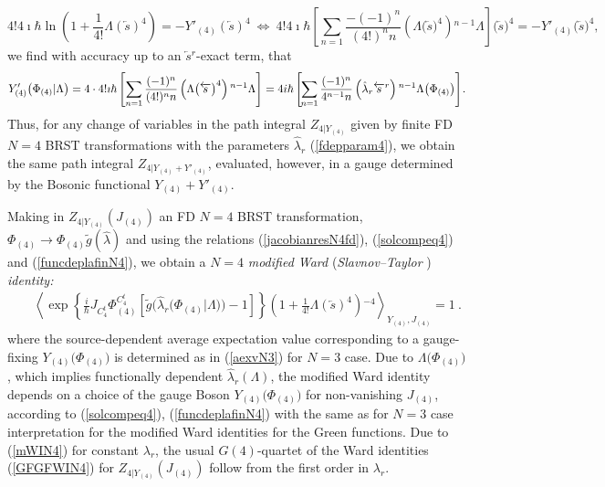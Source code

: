 \documentclass[10pt]{article}
\begin{document}
\begin{equation}
4!4\imath\hbar\ln\left( 1+\frac{1}{4!}\Lambda(\overleftarrow{s})^4\right)
= -Y'_{(4)}(\overleftarrow{s})^4\ \Longleftrightarrow\ 4!4 \imath\hbar\left[
\sum_{n=1}\frac{-(-1)^{n}}{(4!)^{n} n}\left( \Lambda\big(\overleftarrow{s}\big)^4\right)
{}^{n-1} \Lambda\right] \big(\overleftarrow{s}\big)^4 =  -Y'_{(4)}\big(\overleftarrow{s}\big)^4, \label{eqexpN4}%
\end{equation}
we find  with accuracy up to an $\overleftarrow{s}{}^{r}$-exact term,
that
\begin{equation}
\label{oppN4sol} Y'_{(4)}\big({\Phi}_{(4)}| \Lambda\big) = 4\cdot4!\imath\hbar\left[ \sum
_{n=1}\frac{(-1)^{n}}{(4!)^{n} n}\left( \Lambda\big(\overleftarrow{s}\big)^{4}\right)
{}^{n-1} \Lambda\right]  = 4i\hbar\left[\hspace{-0.1em} \sum_{n=1}\frac{(-1)^{n}%
}{4^{n-1} n}\left( \hat{\lambda}_{r}\overleftarrow{s}^{r}\right) {}^{n-1}
\Lambda\big({\Phi}_{(4)}\big)\right]\hspace{-0.1em} .
\end{equation}
Thus, for any change of variables in the path integral $Z_{4|Y_{(4)}}$
given by finite FD $N=4$ BRST transformations with the parameters
$\hat{\lambda}_{r}$ (\ref{fdepparam4}),
we obtain %
the same path integral $Z_{4|Y_{(4)}+ Y'_{(4)}}$, evaluated, however,
in a gauge determined by the Bosonic functional $Y_{(4)}+ Y'_{(4)}$.

Making in $Z_{4|Y_{(4)}}({J}_{(4)})$ an FD $N=4$ BRST  transformation,
${\Phi}_{(4)} \to {\Phi}_{(4)}\tilde{g}(\hat{\lambda})$
and using the relations (\ref{jacobianresN4fd}), (\ref{solcompeq4}) and (\ref{funcdeplafinN4}),
we obtain a $N=4$ \emph{modified Ward} (\emph{Slavnov--Taylor}%
) \emph{identity:}%
\begin{eqnarray}
&& \left\langle \exp\left\{ \frac{i}{\hbar}{J}_{C^t_4}{\Phi}{}^{C^t_4}_{(4)}\left[ \tilde{g}\big(\hat{\lambda}_r\big({\Phi}_{(4)}|\Lambda\big)\big)-1\right]\right\}  \left(  1+\frac{1}{4!}\Lambda(\overleftarrow
{s})^{4}\right)  {}^{-4}\right\rangle _{Y_{(4)},{J}_{(4)}} =1\ . \label{mWIN4}%
\end{eqnarray}
where the  source-dependent average expectation value corresponding to a gauge-fixing
$Y_{(4)}\big({\Phi}_{(4)}\big)$ is determined as in (\ref{aexvN3}) for $N=3$ case.
Due to  $\Lambda\big({\Phi}_{(4)}\big)$, which implies functionally dependent
$\hat{\lambda}_{r}(\Lambda)$, the modified Ward identity depends on a choice
of the gauge Boson $Y_{(4)}\big({\Phi}_{(4)}\big)$ for non-vanishing
${J}_{(4)}$, according to (\ref{solcompeq4}), (\ref{funcdeplafinN4}) with the same as for $N=3$ case interpretation for the  modified Ward identities for the Green functions.
Due to (\ref{mWIN4}) for constant ${\lambda}_{r}$, the usual $G(4)$-quartet
of the Ward identities (\ref{GFGFWIN4}) for $Z_{4|Y_{(4)}}({J}_{(4)})$ follow
from the first order in $\lambda_{r}$.
\end{document}
